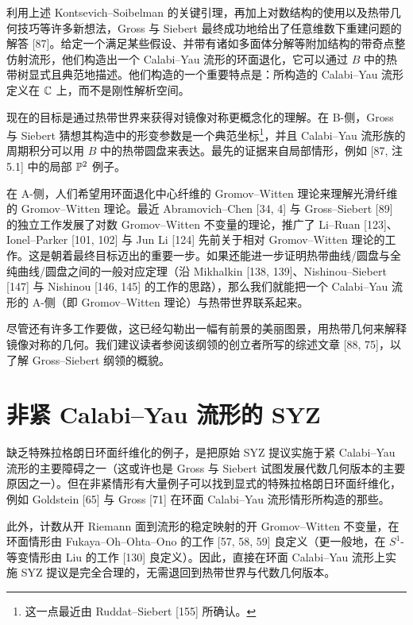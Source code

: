 利用上述 Kontsevich--Soibelman 的关键引理，再加上对数结构的使用以及热带几何技巧等许多新想法，Gross 与 Siebert 最终成功地给出了任意维数下重建问题的解答 [87]。给定一个满足某些假设、并带有诸如多面体分解等附加结构的带奇点整仿射流形，他们构造出一个 Calabi--Yau 流形的环面退化，它可以通过 $B$ 中的热带树显式且典范地描述。他们构造的一个重要特点是：所构造的 Calabi--Yau 流形定义在 $\mathbb{C}$ 上，而不是刚性解析空间。

现在的目标是通过热带世界来获得对镜像对称更概念化的理解。在 B-侧，Gross 与 Siebert 猜想其构造中的形变参数是一个典范坐标\footnote{这一点最近由 Ruddat--Siebert [155] 所确认。}，并且 Calabi--Yau 流形族的周期积分可以用 $B$ 中的热带圆盘来表达。最先的证据来自局部情形，例如 [87, 注 5.1] 中的局部 $\mathbb{P}^2$ 例子。

在 A-侧，人们希望用环面退化中心纤维的 Gromov--Witten 理论来理解光滑纤维的 Gromov--Witten 理论。最近 Abramovich--Chen [34, 4] 与 Gross--Siebert [89] 的独立工作发展了对数 Gromov--Witten 不变量的理论，推广了 Li--Ruan [123]、Ionel--Parker [101, 102] 与 Jun Li [124] 先前关于相对 Gromov--Witten 理论的工作。这是朝着最终目标迈出的重要一步。如果还能进一步证明热带曲线/圆盘与全纯曲线/圆盘之间的一般对应定理（沿 Mikhalkin [138, 139]、Nishinou--Siebert [147] 与 Nishinou [146, 145] 的工作的思路），那么我们就能把一个 Calabi--Yau 流形的 A-侧（即 Gromov--Witten 理论）与热带世界联系起来。

尽管还有许多工作要做，这已经勾勒出一幅有前景的美丽图景，用热带几何来解释镜像对称的几何。我们建议读者参阅该纲领的创立者所写的综述文章 [88, 75]，以了解 Gross--Siebert 纲领的概貌。

\section{非紧 Calabi--Yau 流形的 SYZ}
缺乏特殊拉格朗日环面纤维化的例子，是把原始 SYZ 提议实施于紧 Calabi--Yau 流形的主要障碍之一（这或许也是 Gross 与 Siebert 试图发展代数几何版本的主要原因之一）。但在非紧情形有大量例子可以找到显式的特殊拉格朗日环面纤维化，例如 Goldstein [65] 与 Gross [71] 在环面 Calabi--Yau 流形情形所构造的那些。

此外，计数从开 Riemann 面到流形的稳定映射的开 Gromov--Witten 不变量，在环面情形由 Fukaya--Oh--Ohta--Ono 的工作 [57, 58, 59] 良定义（更一般地，在 $S^1$-等变情形由 Liu 的工作 [130] 良定义）。因此，直接在环面 Calabi--Yau 流形上实施 SYZ 提议是完全合理的，无需退回到热带世界与代数几何版本。

